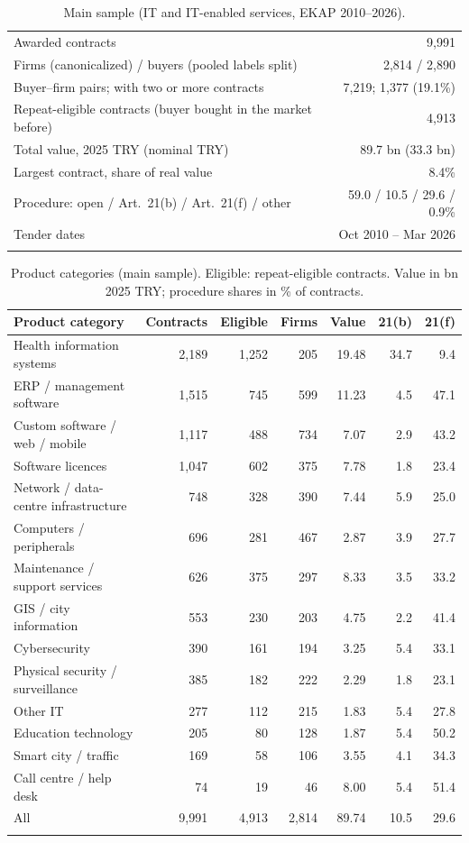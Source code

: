\documentclass[pdflatex,sn-apa]{sn-jnl}
\begin{document}
\begin{table}[t]
\caption{Main sample (IT and IT-enabled services, EKAP 2010--2026).}\label{tab:data}
\begin{tabular}{@{}lr@{}}
\toprule
Awarded contracts & 9,991\\
Firms (canonicalized) / buyers (pooled labels split) & 2,814 / 2,890\\
Buyer--firm pairs; with two or more contracts & 7,219; 1,377 (19.1\%)\\
Repeat-eligible contracts (buyer bought in the market before) & 4,913\\
Total value, 2025 TRY (nominal TRY) & 89.7 bn (33.3 bn)\\
Largest contract, share of real value & 8.4\%\\
Procedure: open / Art.~21(b) / Art.~21(f) / other & 59.0 / 10.5 / 29.6 / 0.9\%\\
Tender dates & Oct 2010 -- Mar 2026\\
\botrule
\end{tabular}
\end{table}

\begin{table}[t]
\caption{Product categories (main sample). Eligible: repeat-eligible contracts. Value in bn 2025 TRY; procedure shares in \% of contracts.}\label{tab:markets}
\begin{tabular}{@{}lrrrrrr@{}}
\toprule
Product category & Contracts & Eligible & Firms & Value & 21(b) & 21(f)\\
\midrule
Health information systems & 2,189 & 1,252 & 205 & 19.48 & 34.7 & 9.4\\
ERP / management software & 1,515 & 745 & 599 & 11.23 & 4.5 & 47.1\\
Custom software / web / mobile & 1,117 & 488 & 734 & 7.07 & 2.9 & 43.2\\
Software licences & 1,047 & 602 & 375 & 7.78 & 1.8 & 23.4\\
Network / data-centre infrastructure & 748 & 328 & 390 & 7.44 & 5.9 & 25.0\\
Computers / peripherals & 696 & 281 & 467 & 2.87 & 3.9 & 27.7\\
Maintenance / support services & 626 & 375 & 297 & 8.33 & 3.5 & 33.2\\
GIS / city information & 553 & 230 & 203 & 4.75 & 2.2 & 41.4\\
Cybersecurity & 390 & 161 & 194 & 3.25 & 5.4 & 33.1\\
Physical security / surveillance & 385 & 182 & 222 & 2.29 & 1.8 & 23.1\\
Other IT & 277 & 112 & 215 & 1.83 & 5.4 & 27.8\\
Education technology & 205 & 80 & 128 & 1.87 & 5.4 & 50.2\\
Smart city / traffic & 169 & 58 & 106 & 3.55 & 4.1 & 34.3\\
Call centre / help desk & 74 & 19 & 46 & 8.00 & 5.4 & 51.4\\
\midrule
All & 9,991 & 4,913 & 2,814 & 89.74 & 10.5 & 29.6\\
\botrule
\end{tabular}
\end{table}
\end{document}
